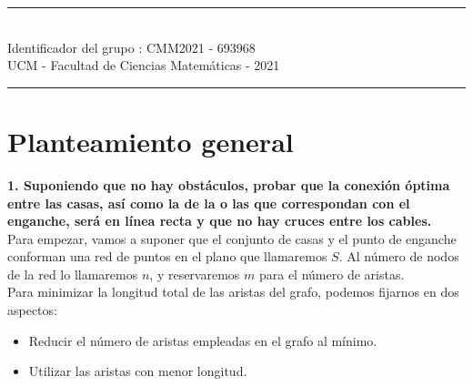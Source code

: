 \documentclass[12pt]{article}
\begin{document}
\begin{titlepage}
    \begin{center}
       \vspace*{0.5cm}
       
       \Large
       \rule{\linewidth}{1pt}  \\
    
       
       \large
       \vspace*{0.5cm}
       Identificador del grupo : CMM2021 - 693968\\
       \vspace*{0.5cm}
       UCM - Facultad de Ciencias Matemáticas - 2021 \\ 
       \rule{\linewidth}{1pt}
       

   \end{center}
   
\end{titlepage}
\newpage
\section{Planteamiento general}
\textbf{1. Suponiendo que no hay obstáculos, probar que la conexión óptima entre las casas, así como la de la o las que correspondan con el enganche, será en línea recta y que no hay cruces entre los cables.} \\
Para empezar, vamos a suponer que el conjunto de casas y el punto de enganche conforman una red de puntos en el plano que llamaremos $S$. Al número de nodos de la red lo llamaremos $n$, y reservaremos $m$ para el número de aristas. \\
Para minimizar la longitud total de las aristas del grafo, podemos fijarnos en dos aspectos:
\begin{itemize}
    \item Reducir el número de aristas empleadas en el grafo al mínimo. 
    \item Utilizar las aristas con menor longitud. 
\end{itemize}
\end{document}
